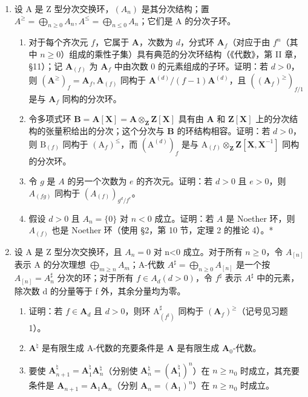 \begin{enumerate}
\def\labelenumi{\arabic{enumi}.}
\tightlist
\item
  设 A 是 Z 型分次交换环，\((A_{n})\) 是其分次结构；置 \(A^{\geq} = \bigoplus_{n \geq 0} A_{n}, A^{\leq} = \bigoplus_{n \leqslant 0} A_{n}\)；它们是 A 的分次子环。

\begin{enumerate}
\def\labelenumii{(\alph{enumii})}
\item
  对于每个齐次元 \(f\)，它属于 \(\mathbf{A}\)，次数为 \(d\)，分式环 \(\mathbf{A}_f\)（对应于由 \(f^n\)（其中 \(n \geqslant 0\)）组成的乘性子集）具有典范的分次环结构（《代数》，第 II 章，§11）；记 \(\mathbf{A}_{(f)}\) 为 \(\mathbf{A}_f\) 中由次数 0 的元素组成的子环。证明：若 \(d > 0\)，则 \((\mathbf{A}^{\geq})_f = \mathbf{A}_f, \mathbf{A}_{(f)}\) 同构于 \(\mathbf{A}^{(d)} / (f - 1)\mathbf{A}^{(d)}\)，且 \(((\mathbf{A}_f)^{\geq})_{f/1}\) 是与 \(\mathbf{A}_f\) 同构的分次环。
\item
  令多项式环 \(\mathbf{B} = \mathbf{A}[\mathbf{X}] = \mathbf{A} \otimes_{\mathbf{Z}} \mathbf{Z}[\mathbf{X}]\) 具有由 \(\mathbf{A}\) 和 \(\mathbf{Z}[\mathbf{X}]\) 上的分次结构的张量积给出的分次；这个分次与 \(\mathbf{B}\) 的环结构相容。证明：若 \(d > 0\)，则 \(\mathrm{B}_{(f)}\) 同构于 \((\mathrm{A}_f)^{\leqslant}\)，而 \((\mathrm{A}^{(d)})_f\) 是与 \(\mathrm{A}_{(f)} \otimes_{\mathbf{Z}} \mathbf{Z}[\mathbf{X}, \mathbf{X}^{-1}]\) 同构的分次环。
\item
  令 \(g\) 是 \(A\) 的另一个次数为 \(e\) 的齐次元。证明：若 \(d > 0\) 且 \(e > 0\)，则 \(A_{(fg)}\) 同构于 \((A_{(f)})_{g^d / f^e}\)。\\
  \item[* (d)] 假设 \(d > 0\) 且 \(A_n = \{0\}\) 对 \(n < 0\) 成立。证明：若 \(A\) 是 Noether 环，则 \(A_{(f)}\) 也是 Noether 环（使用 §2，第 10 节，定理 2 的推论 4）。*
\end{enumerate}

\item
  设 A 是 Z 型分次交换环，且 \(A_{n}=0\) 对 n\textless0 成立。对于所有 \(n\geqslant0\)，令 \(A_{[n]}\) 表示 A 的分次理想 \(\bigoplus_{m\geqslant n}A_{m}\)；A-代数 \(A^{\sharp}=\bigoplus_{n\geqslant0}A_{[n]}\) 是一个按 \(A_{[n]}=A_{n}^{\sharp}\) 分次的环；对于所有 \(f\in A_{d}(d>0)\)，令 \(f^{\sharp}\) 表示 \(A^{\sharp}\) 中的元素，除次数 d 的分量等于 f 外，其余分量均为零。

\begin{enumerate}
\def\labelenumii{(\alph{enumii})}
\item
  证明：若 \(f \in \mathbf{A}_d\) 且 \(d > 0\)，则环 \(\mathrm{A}_{(f^{\sharp})}^{\sharp}\) 同构于 \((\mathbf{A}_f)^{\geqslant}\)（记号见习题 1）。
\item
  \(\mathbf{A}^{\natural}\) 是有限生成 A-代数的充要条件是 \(\mathbf{A}\) 是有限生成 \(\mathbf{A}_0\)-代数。
\item
  要使 \(\mathbf{A}_{n+1}^{\natural} = \mathbf{A}_1^{\natural}\mathbf{A}_n^{\natural}\)（分别使 \(\mathbf{A}_n^{\natural} = (\mathbf{A}_1^{\natural})^n\)）在 \(n \geqslant n_0\) 时成立，其充要条件是 \(\mathbf{A}_{n+1} = \mathbf{A}_1\mathbf{A}_n\)（分别 \(\mathbf{A}_n = (\mathbf{A}_1)^n\)）在 \(n \geqslant n_0\) 时成立。
\end{enumerate}


\end{enumerate}
